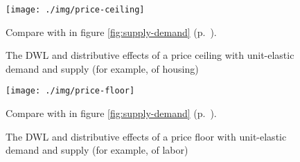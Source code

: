 \begin{figure}[htbp]
	\begin{center}
	\texttt{[image: ./img/price-ceiling]}
	\caption[Efficiency and Equity of a Price Ceiling]{The \gls{DWL} and distributive effects of a price ceiling with unit-elastic demand and supply (for example, of housing)}
	\end{center}
	\scriptsize{Compare with  in figure \ref{fig:supply-demand} (p.~\pageref{fig:supply-demand}).}
	\label{fig:price-ceiling}
\end{figure}

\begin{figure}[htbp]
	\begin{center}
	\texttt{[image: ./img/price-floor]}
	\caption[Efficiency and Equity of a Price Floor]{The \gls{DWL} and distributive effects of a price floor with unit-elastic demand and supply (for example, of labor)}
	\end{center}
	\scriptsize{Compare with  in figure \ref{fig:supply-demand} (p.~\pageref{fig:supply-demand}).}
	\label{fig:price-floor}
\end{figure}

